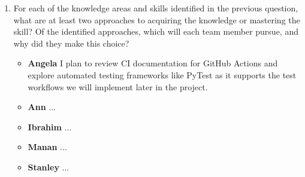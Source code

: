 \documentclass[12pt, titlepage]{article}
\begin{document}
\begin{enumerate}
  \item For each of the knowledge areas and skills identified in the previous
  question, what are at least two approaches to acquiring the knowledge or
  mastering the skill?  Of the identified approaches, which will each team
  member pursue, and why did they make this choice?
  \begin{itemize}
      \item \textbf{Angela} I plan to review CI documentation for GitHub Actions and explore automated testing frameworks like PyTest as it supports the test workflows we will implement later in the project.
      \item \textbf{Ann} ...
      \item \textbf{Ibrahim} ...
      \item \textbf{Manan} ...
      \item \textbf{Stanley} ...
    \end{itemize}

\end{enumerate}
\end{document}
